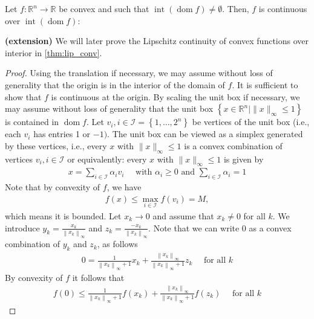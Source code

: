 \documentclass{article}
\newcommand{\bfs}[1]{\textbf{({#1}) }}
\newcommand{\dom}{\operatorname{dom}}
\begin{document}
\begin{thma}
Let $f: \mathbb{R}^{n} \rightarrow \mathbb{R}$ be convex and such that $\operatorname{int}(\dom  f) \neq \emptyset$. Then, $f$ is continuous over $\operatorname{int}(\dom  f)$:

\centerline{}
\end{thma}
\begin{exma}{\bfs{extension}}
We will later prove the Lipschitz continuity of convex functions over interior in \cref{thm:lip_conv}.
\end{exma}


\begin{proof}\color{ForestGreen}
 Using the translation if necessary, we may assume without loss of generality that the origin is in the interior of the domain of $f$.
It is sufficient to show that $f$ is continuous at the origin.
By scaling the unit box if necessary, we may assume without loss of generality that the unit box $\left\{x \in \mathbb{R}^{n} \mid\|x\|_{\infty} \leq 1\right\}$ is contained in $\dom  f$.
 Let $v_{i}, i \in \mathcal{I}=\left\{1, \ldots, 2^{n}\right\}$ be vertices of the unit box (i.e., each $v_{i}$ has entries 1 or $-1)$. The unit box can be viewed as a simplex generated by these vertices, i.e.,
every $x$ with $\|x\|_{\infty} \leq 1$ is a convex combination of vertices $v_{i}, i \in \mathcal{I}$
or equivalently: every $x$ with $\|x\|_{\infty} \leq 1$ is given by
\begin{align*}
x=\sum_{i \in \mathcal{I}} \alpha_{i} v_{i} \quad \text { with } \alpha_{i} \geq 0 \text { and } \sum_{i \in \mathcal{I}} \alpha_{i}=1
\end{align*}
Note that by convexity of $f$, we have
\begin{align*}
f(x) \leq \max _{i \in \mathcal{I}} f\left(v_{i}\right)=M,
\end{align*}
which means it is bounded. Let $x_{k} \rightarrow 0$ and assume that $x_{k} \neq 0$ for all $k$.
We introduce $y_{k}=\frac{x_{k}}{\left\|x_{k}\right\|_{\infty}}$ and $z_{k}=\frac{-x_{k}}{\left\|x_{k}\right\|_{\infty}}$.
Note that we can write 0 as a convex combination of $y_{k}$ and $z_{k}$, as follows
\begin{align*}
0=\frac{1}{\left\|x_{k}\right\|_{\infty}+1} x_{k}+\frac{\left\|x_{k}\right\|_{\infty}}{\left\|x_{k}\right\|_{\infty}+1} z_{k} \quad \text { for all } k
\end{align*}
By convexity of $f$ it follows that
\begin{align*}
f(0) \leq \frac{1}{\left\|x_{k}\right\|_{\infty}+1} f\left(x_{k}\right)+\frac{\left\|x_{k}\right\|_{\infty}}{\left\|x_{k}\right\|_{\infty}+1} f\left(z_{k}\right) \quad \text { for all } k

\end{align*}
\end{proof}
\end{document}
